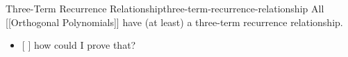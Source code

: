 \begin{definition}{Three-Term Recurrence Relationship}{three-term-recurrence-relationship}
  All {[}{[}Orthogonal Polynomials{]}{]} have (at least) a three-term
  recurrence relationship.

  \begin{itemize}
    \tightlist
    \item
          {[} {]} how could I prove that?
  \end{itemize}
\end{definition}
